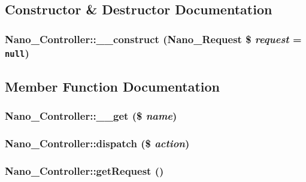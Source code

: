 \subsection{Constructor \& Destructor Documentation}
\hypertarget{classNano__Controller_a3b272e29dad6fdec1788fe25f330f76}{
\subsubsection[{\_\-\_\-construct}]{\setlength{\rightskip}{0pt plus 5cm}Nano\_\-Controller::\_\-\_\-construct ({\bf Nano\_\-Request} \$ {\em request} = {\tt null})}}
\label{classNano__Controller_a3b272e29dad6fdec1788fe25f330f76}




\subsection{Member Function Documentation}
\hypertarget{classNano__Controller_31302bed903d1b07b119442f50ce1840}{
\subsubsection[{\_\-\_\-get}]{\setlength{\rightskip}{0pt plus 5cm}Nano\_\-Controller::\_\-\_\-get (\$ {\em name})}}
\label{classNano__Controller_31302bed903d1b07b119442f50ce1840}


\hypertarget{classNano__Controller_216f1396012fe508ecebf2606f7b15df}{
\subsubsection[{dispatch}]{\setlength{\rightskip}{0pt plus 5cm}Nano\_\-Controller::dispatch (\$ {\em action})}}
\label{classNano__Controller_216f1396012fe508ecebf2606f7b15df}


\hypertarget{classNano__Controller_bd0bd1a7bc64c12622ad0dc00d035172}{
\subsubsection[{getRequest}]{\setlength{\rightskip}{0pt plus 5cm}Nano\_\-Controller::getRequest ()}}
\label{classNano__Controller_bd0bd1a7bc64c12622ad0dc00d035172}


